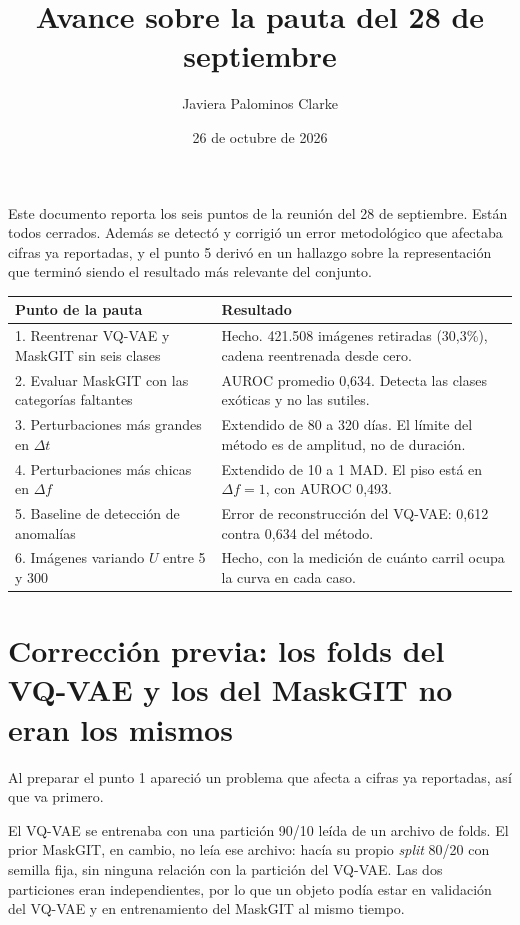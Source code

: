 \documentclass[11pt,a4paper]{article}
\title{\vspace{-1.5cm}Avance sobre la pauta del 28 de septiembre}
\author{Javiera Palominos Clarke}
\date{26 de octubre de 2026}
\begin{document}
\maketitle
\vspace{-0.8cm}

Este documento reporta los seis puntos de la reunión del 28 de septiembre. Están todos
cerrados. Además se detectó y corrigió un error metodológico que afectaba cifras ya
reportadas, y el punto 5 derivó en un hallazgo sobre la representación que terminó siendo
el resultado más relevante del conjunto.

\begin{table}[H]
\centering
\small
\begin{tabular}{@{}p{7.4cm}p{8.4cm}@{}}
\toprule
\textbf{Punto de la pauta} & \textbf{Resultado} \\
\midrule
1. Reentrenar VQ-VAE y MaskGIT sin seis clases &
Hecho. 421.508 imágenes retiradas (30,3\%), cadena reentrenada desde cero. \\[0.3em]
2. Evaluar MaskGIT con las categorías faltantes &
AUROC promedio 0,634. Detecta las clases exóticas y no las sutiles. \\[0.3em]
3. Perturbaciones más grandes en $\Delta t$ &
Extendido de 80 a 320 días. El límite del método es de amplitud, no de duración. \\[0.3em]
4. Perturbaciones más chicas en $\Delta f$ &
Extendido de 10 a 1 MAD. El piso está en $\Delta f = 1$, con AUROC 0,493. \\[0.3em]
5. Baseline de detección de anomalías &
Error de reconstrucción del VQ-VAE: 0,612 contra 0,634 del método. \\[0.3em]
6. Imágenes variando $U$ entre 5 y 300 &
Hecho, con la medición de cuánto carril ocupa la curva en cada caso. \\
\bottomrule
\end{tabular}
\end{table}

\section*{Corrección previa: los folds del VQ-VAE y los del MaskGIT no eran los mismos}

Al preparar el punto 1 apareció un problema que afecta a cifras ya reportadas, así que va
primero.

El VQ-VAE se entrenaba con una partición 90/10 leída de un archivo de folds. El prior
MaskGIT, en cambio, no leía ese archivo: hacía su propio \textit{split} 80/20 con semilla
fija, sin ninguna relación con la partición del VQ-VAE. Las dos particiones eran
independientes, por lo que un objeto podía estar en validación del VQ-VAE y en
entrenamiento del MaskGIT al mismo tiempo.
\end{document}

